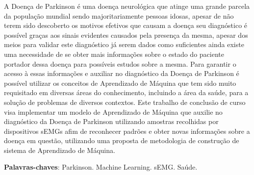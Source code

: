 \begin{resumo}
    A Doença de Parkinson é uma doença neurológica que atinge uma grande parcela da população mundial sendo majoritariamente pessoas idosas, apesar de não terem sido descoberto os motivos efetivos que causam a doença seu diagnóstico é possível graças aos sinais evidentes causados pela presença da mesma, apesar dos meios para validar este diagnóstico já serem dados como suficientes ainda existe uma necessidade de se obter mais informações sobre o estado do paciente portador dessa doença para possíveis estudos sobre a mesma. Para garantir o acesso à essas informações e auxiliar no diagnóstico da Doença de Parkinson é possível utilizar os conceitos de Aprendizado de Máquina que tem sido muito requisitado em diversas áreas do conhecimento, incluindo a área da saúde, para a solução de problemas de diversos contextos. Este trabalho de conclusão de curso visa implementar um modelo de Aprendizado de Máquina que auxilie no diagnóstico da Doença de Parkinson utilizando amostras recolhidas por dispositivos sEMGs afim de reconhecer padrões e obter novas informações sobre a doença em questão, utilizando uma proposta de metodologia de construção de sistema de Aprendizado de Máquina.

 \vspace{\onelineskip}
    
 \noindent
 \textbf{Palavras-chaves}: Parkinson. Machine Learning. sEMG. Saúde.
\end{resumo}
